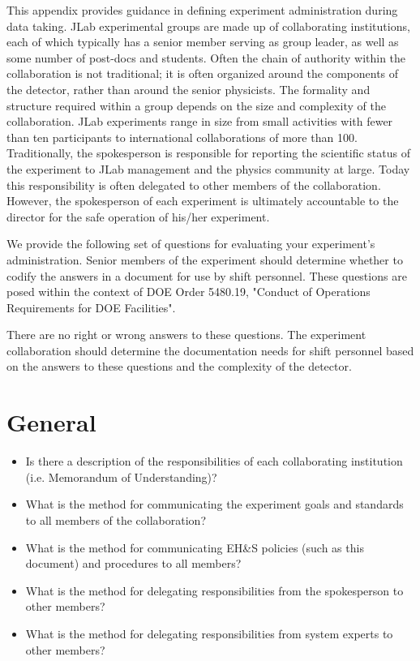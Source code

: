 %
%

	This appendix provides guidance in defining experiment administration during 
data taking. JLab experimental groups are made up of collaborating institutions, each 
of which typically has a senior member serving as group leader, as well as some number 
of post-docs and students. Often the chain of authority within the collaboration is not 
traditional; it is often organized around the components of the detector, rather than around 
the senior physicists. The formality and structure required within a group depends on the 
size and complexity of the collaboration. JLab experiments range in size from small 
activities with fewer than ten participants to international collaborations of more than 
100.  Traditionally, the spokesperson is responsible for reporting the scientific status of 
the experiment to JLab management and the physics community at large. Today this 
responsibility is often delegated to other members of the collaboration. However, the 
spokesperson of each experiment is ultimately accountable to the director for the safe 
operation of his/her experiment.

	We provide the following set of questions for evaluating your experiment's 
administration. Senior members of the experiment should determine whether to codify the 
answers in a document for use by shift personnel. These questions are posed within the 
context of DOE Order 5480.19, "Conduct of Operations Requirements for DOE 
Facilities".

	There are no right or wrong answers to these questions. The experiment 
collaboration should determine the documentation needs for shift personnel based on the 
answers to these questions and the complexity of the detector.

\section{General}

\begin{itemize}
\item Is there a description of the responsibilities of each collaborating
institution (i.e. Memorandum of Understanding)?

\item   What is the method for communicating the experiment goals and standards
to all members of the collaboration?

\item   What is the method for communicating EH\&S policies (such as this document) 
and procedures to all members?

\item   What is the method for delegating responsibilities from the spokesperson to other 
members?

\item   What is the method for delegating responsibilities from system experts to other 
members?

\end{itemize}

